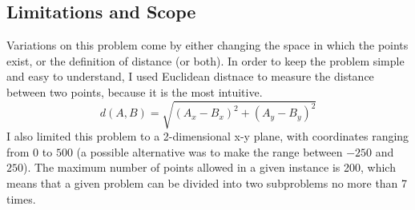 \subsection{Limitations and Scope}
\hspace{-0.26in}
Variations on this problem come by either changing the space in which 
the points exist, or the definition of distance (or both). 
In order to keep the problem simple and easy to understand, 
I used Euclidean distnace to measure the distance between two points, 
because it is the most intuitive. 
\begin{displaymath}
d(A, B) = \sqrt{(A_x - B_x)^2 + (A_y - B_y)^2}
\end{displaymath}
I also limited this problem to a 2-dimensional x-y plane, with coordinates 
ranging from $0$ to $500$ 
(a possible alternative was to make the range between $-250$ and $250$).
The maximum number of points allowed in a given instance is 200,
which means that a given problem can be divided into two subproblems 
no more than 7 times.